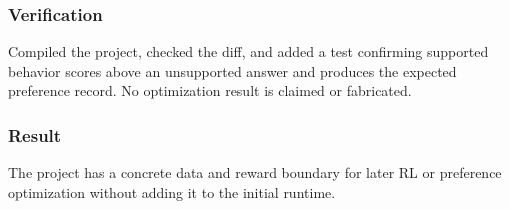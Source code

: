 \subsubsection{Verification}

Compiled the project, checked the diff, and added a test confirming supported behavior scores above an unsupported answer and produces the expected preference record. No optimization result is claimed or fabricated.

\subsubsection{Result}

The project has a concrete data and reward boundary for later RL or preference optimization without adding it to the initial runtime.

